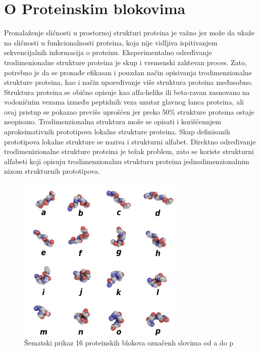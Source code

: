 \documentclass[a4paper,12pt]{article}
\begin{document}
\section{O Proteinskim blokovima}
Pronalaženje sličnosti u prostornoj strukturi proteina je važno jer može da ukaže na sličnosti u funkcionalnosti proteina, koja nije vidljiva ispitivanjem sekvencijalnih informacija o proteinu. Eksperimentalno određivanje trodimenionalne strukture proteina je skup i vremenski zahtevan proces. Zato, potrebno je da se pronađe efikasan i pouzdan način opisivanja trodimenzionalne strukture proteina, kao i način upoređivanje više struktura proteina međusobno.
\\
Struktura proteina se obično opisuje kao alfa-heliks ili beta-ravan zasnovano na vodoničnim vezama između peptidnih veza unutar glavnog lanca proteina, ali ovaj pristup se pokazao previše uprošćen jer preko 50\% strukture proteina ostaje neopisano. 
Trodimenzionalna struktura može se opisati i korišćennjem aproksimativnih prototipova lokalne strukture proteina. Skup definisanih prototipova lokalne strukture se naziva i strukturni alfabet. Direktno određivanje trodimenizionalne strukture proteina je težak problem, zato se koriste strukturni alfabeti koji opisuju trodimenzionalnu strukturu proteina jednodimenzionalnim nizom strukturnih prototipova. 

\begin{figure}[h!]
    \centering
    \includegraphics[width=0.7\textwidth]{./images/PBs.jpg}
    \caption{Šematski prikaz 16 proteinskih blokova označenh slovima od a do p}
    \label{Slika:1}
\end{figure}
\end{document}
